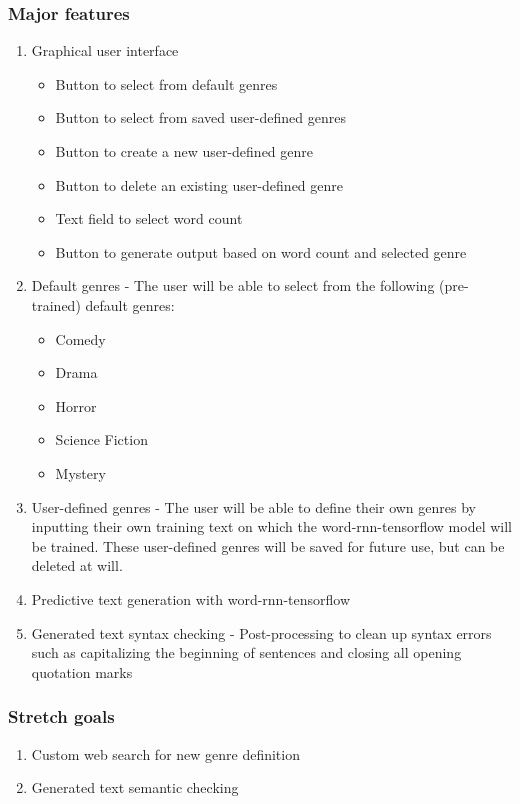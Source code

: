 \documentclass[12pt]{article}
\begin{document}
\subsubsection{Major features}
\begin{enumerate}
\item Graphical user interface
\begin{itemize}
\item Button to select from default genres
\item Button to select from saved user-defined genres
\item Button to create a new user-defined genre
\item Button to delete an existing user-defined genre
\item Text field to select word count
\item Button to generate output based on word count and selected genre
\end{itemize}

\item Default genres - The user will be able to select from the following (pre-trained) default genres:
\begin{itemize}
\item Comedy
\item Drama
\item Horror
\item Science Fiction
\item Mystery
\end{itemize}

\item User-defined genres - The user will be able to define their own genres by inputting their own training text on which the word-rnn-tensorflow model will be trained. These user-defined genres will be saved for future use, but can be deleted at will.
\item Predictive text generation with word-rnn-tensorflow
\item Generated text syntax checking - Post-processing to clean up syntax errors such as capitalizing the beginning of sentences and closing all opening quotation marks
\end{enumerate}

\subsubsection{Stretch goals}
\begin{enumerate}
\item Custom web search for new genre definition
\item Generated text semantic checking
\end{enumerate}
\end{document}
